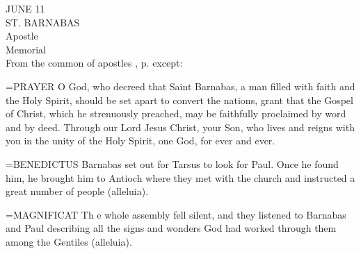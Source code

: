\begin{center}\normalsize JUNE 11\\
\footnotesize ST. BARNABAS\\
\footnotesize Apostle\\
\footnotesize Memorial\\
\footnotesize From the common of apostles , p.    except:\\
\end{center}

\hangindent=\parindent \small{PRAYER 
O God, who decreed that Saint Barnabas,
a man filled with faith and the Holy Spirit,
should be set apart to convert the nations,
grant that the Gospel of Christ,
which he strenuously preached,
may be faithfully proclaimed by word and by deed.
Through our Lord Jesus Christ, your Son,
who lives and reigns with you in the unity of the Holy Spirit,
one God, for ever and ever.\\}
 
\hangindent=\parindent \small{BENEDICTUS  Barnabas set out for Tarsus to look for Paul. Once he
found him, he brought him to Antioch where they met with the
church and instructed a great number of people (alleluia).\\}
 
\hangindent=\parindent \small{MAGNIFICAT  Th e whole assembly fell silent, and they listened to
Barnabas and Paul describing all the signs and wonders God had
worked through them among the Gentiles (alleluia).\\}
 
